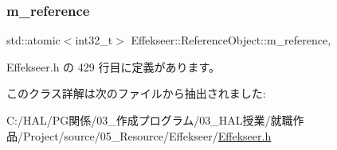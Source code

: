 \subsubsection{\texorpdfstring{m\+\_\+reference}{m\_reference}}
{\footnotesize\ttfamily std\+::atomic$<$int32\+\_\+t$>$ Effekseer\+::\+Reference\+Object\+::m\+\_\+reference\hspace{0.3cm}{\ttfamily [mutable]}, {\ttfamily [private]}}



 Effekseer.\+h の 429 行目に定義があります。



このクラス詳解は次のファイルから抽出されました\+:\begin{DoxyCompactItemize}
\item 
C\+:/\+H\+A\+L/\+P\+G関係/03\+\_\+作成プログラム/03\+\_\+\+H\+A\+L授業/就職作品/\+Project/source/05\+\_\+\+Resource/\+Effekseer/\mbox{\hyperlink{_effekseer_8h}{Effekseer.\+h}}\end{DoxyCompactItemize}
